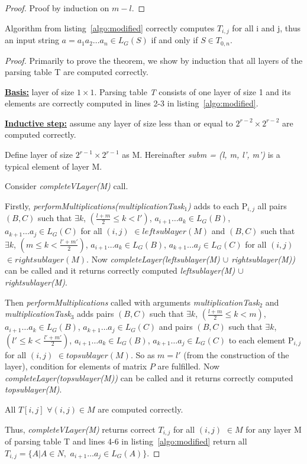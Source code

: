 \begin{proof}
Proof by induction on $m - l$.
\end{proof}

\begin{theorem}
Algorithm from listing~\ref{algo:modified} correctly computes $T_{i, j}$ for all i and j, thus an input string $a = a_{1}a_{2} \dots a_{n} \in L_{G}(S)$ if and only if $S \in T_{0, n}$.
\end{theorem}

\begin{proof}
Primarily to prove the theorem, we show by induction that all layers of the parsing table T are computed correctly.

\underline{\textbf{Basis:}} layer of size $1 \times 1$.
Parsing table \textit{T} consists of one layer of size 1 and its elements are correctly computed in lines 2-3 in listing~\ref{algo:modified}.

\underline{\textbf{Inductive step:}} assume any layer of size less than or equal to $2^{r - 2} \times 2^{r - 2}$ are computed correctly. 

Define layer of size $2^{r - 1} \times 2^{r - 1}$ as M. 
Hereinafter \textit{subm = (l, m, l', m')} is a typical element of layer M.

Consider \textit{completeVLayer(M)} call. 

Firstly, \textit{performMultiplications(multiplicationTask$_1$)} adds to each P$_{i,j}$ all pairs 
$(B, C)$ such that $\exists k$, $(\frac{l+m}{2} \le k < l')$, $a_{i + 1} \dots a_{k} \in L_{G}(B)$, $a_{k + 1} \dots a_{j} \in L_{G}(C)$ for all $(i, j)$ $\in leftsublayer(M)$
and
$(B, C)$ such that $\exists k$, $(m \le k < \frac{l'+m'}{2})$, $a_{i + 1} \dots a_{k} \in L_{G}(B)$, $a_{k + 1} \dots a_{j} \in L_{G}(C)$ for all $(i, j)$ $\in rightsublayer(M)$.
Now \textit{completeLayer(leftsublayer(M) $\cup$ rightsublayer(M))} can be called and it returns correctly computed \textit{leftsublayer(M) $\cup$ rightsublayer(M)}.

Then \textit{performMultiplications} called with arguments 
\textit{multiplicationTask$_2$} and \textit{multiplicationTask$_3$} adds pairs 
$(B, C)$ such that $\exists k$, $(\frac{l+m}{2} \le k < m)$, $a_{i + 1} \dots a_{k} \in L_{G}(B)$, $a_{k + 1} \dots a_{j} \in L_{G}(C)$ 
and pairs
$(B, C)$ such that $\exists k$, $(l' \le k < \frac{l'+m'}{2})$, $a_{i + 1} \dots a_{k} \in L_{G}(B)$, $a_{k + 1} \dots a_{j} \in L_{G}(C)$
to each element P$_{i,j}$ for all $(i, j)$ $\in topsublayer(M)$. 
So as $m = l'$ (from the construction of the layer), condition for elements of matrix $P$ are fulfilled.
Now \textit{completeLayer(topsublayer(M))} can be called and it returns correctly computed \textit{topsublayer(M)}.

All $T[i, j]$ $\forall (i, j) \in M$ are computed correctly.

Thus, \textit{completeVLayer(M)} returns correct $T_{i, j}$ for all $(i, j)$ $\in M$ for any layer M of parsing table T and lines 4-6 in listing~\ref{algo:modified} return all $T_{i, j} =  \{ A | A \in N, $ $a_{i + 1} \dots a_{j} \in L_{G}(A)\}$.
\end{proof}


